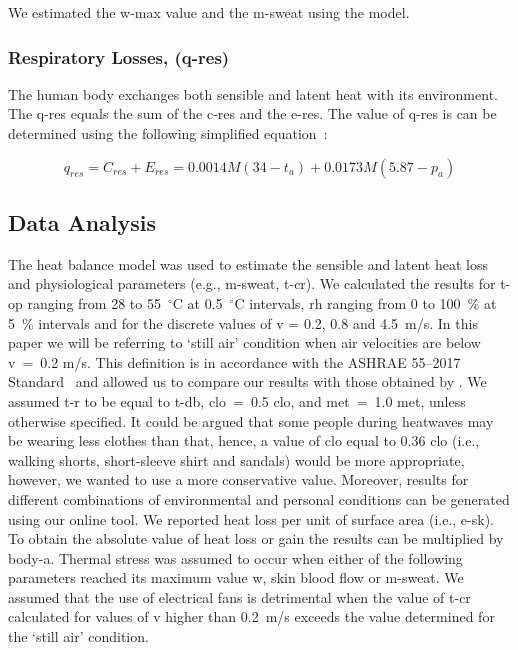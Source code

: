We estimated the \ac{w-max} value and the \ac{m-sweat} using the  model.

\subsubsection{Respiratory Losses, (\acs{q-res})}
The human body exchanges both sensible and latent heat with its environment.
The \acf{q-res} equals the sum of the \ac{c-res} and the \ac{e-res}.
The value of \ac{q-res} is can be determined using the following simplified equation~\cite{ASHRA2017}:

\begin{equation}
    q_{res} = C_{res} + E_{res} = 0.0014M(34-t_{a}) + 0.0173M(5.87-p_{a})\label{eq:respiratory-losses}
\end{equation}

\subsection{Data Analysis}\label{subsec:data-analysis}

The heat balance model was used to estimate the sensible and latent heat loss and physiological parameters (e.g., \ac{m-sweat}, \ac{t-cr}).
We calculated the results for \ac{t-op} ranging from 28 to 55~$^{\circ}$C at 0.5~$^{\circ}$C intervals, \ac{rh} ranging from 0 to 100~\% at 5~\% intervals and for the discrete values of \ac{v} = 0.2, 0.8 and 4.5~m/s.
In this paper we will be referring to `still air' condition when air velocities are below \ac{v}~=~0.2 m/s.
This definition is in accordance with the ASHRAE 55--2017 Standard~\cite{ashrae552017} and allowed us to compare our results with those obtained by .
We assumed \ac{t-r} to be equal to \ac{t-db}, \ac{clo}~=~0.5 clo, and \ac{met}~=~1.0 met, unless otherwise specified.
It could be argued that some people during heatwaves may be wearing less clothes than that, hence, a value of \ac{clo} equal to 0.36 clo (i.e., walking shorts, short-sleeve shirt and sandals) would be more appropriate, however, we wanted to use a more conservative value.
Moreover, results for different combinations of environmental and personal conditions can be generated using our online tool.
We reported heat loss per unit of surface area (i.e., \ac{e-sk}).
To obtain the absolute value of heat loss or gain the results can be multiplied by \ac{body-a}.
Thermal stress was assumed to occur when either of the following parameters reached its maximum value \ac{w}, skin blood flow or \ac{m-sweat}.
We assumed that the use of electrical fans is detrimental when the value of \ac{t-cr} calculated for values of \ac{v} higher than 0.2~m/s exceeds the value determined for the `still air' condition.

